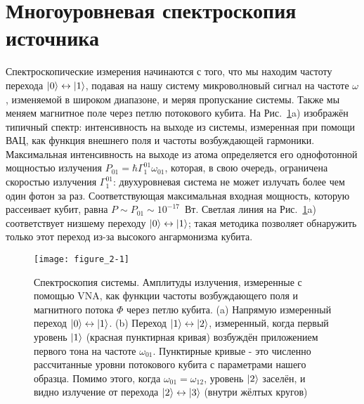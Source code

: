 \section{Многоуровневая спектроскопия источника}
Спектроскопические измерения начинаются с того, что мы находим частоту перехода $\ket{0} \leftrightarrow \ket{1}$, подавая на нашу систему микроволновый сигнал на частоте $\omega$, изменяемой в широком диапазоне, и меряя пропускание системы. Также мы меняем магнитное поле через петлю потокового кубита. На Рис.~\ref{spectr}a) изображён типичный спектр: интенсивность на выходе из системы, измеренная при помощи ВАЦ, как функция внешнего поля и частоты возбуждающей гармоники. Максимальная интенсивность на выходе из атома определяется его однофотонной мощностью излучения $P_{01}=\hbar\Gamma^{01}_1 \omega_{01}$, которая, в свою очередь, ограничена скоростью излучения $\Gamma^{01}_1$: двухуровневая система не может излучать более чем один фотон за раз. Соответствующая максимальная входная мощность, которую рассеивает кубит, равна $P \sim P_{01} \sim 10^{-17}$~Вт. Светлая линия на Рис.~\ref{spectr}a) соответствует низшему переходу $\ket{0} \leftrightarrow \ket{1}$; такая методика позволяет обнаружить только этот переход из-за высокого ангармонизма кубита.
\begin{figure*}[htb] 
	\texttt{[image: figure\_2-1]} 
	\caption{Спектроскопия системы. Амплитуды излучения, измеренные с помощью VNA, как функции частоты возбуждающего поля и магнитного потока $\Phi$ через петлю кубита. (a) Напрямую измеренный переход $\ket{0}\leftrightarrow \ket{1}$. (b) Переход $\ket{1}\leftrightarrow\ket{2}$, измеренный, когда первый уровень $\ket{1}$ (красная пунктирная кривая) возбуждён приложением первого тона на частоте $\omega_{01}$. Пунктирные кривые - это численно рассчитанные уровни потокового кубита с параметрами нашего образца. Помимо этого, когда $\omega_{01}=\omega_{12}$, уровень $\ket{2}$ заселён, и видно излучение от перехода $\ket{2}\leftrightarrow\ket{3}$ (внутри жёлтых кругов)   }
	\label{spectr}
\end{figure*}
